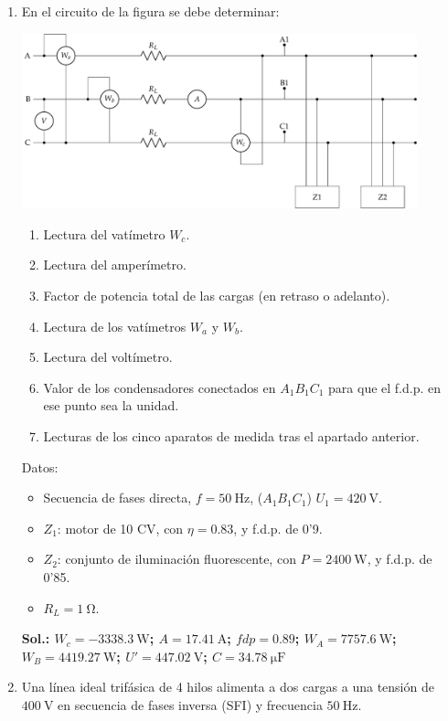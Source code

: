 \begin{enumerate}
\item En el circuito de la figura se debe determinar:

\begin{center}
  \includegraphics[width=0.9\textwidth]{../figs/BT3_11.pdf}
\end{center}

\begin{enumerate}
\item Lectura del vatímetro $W_c$.
\item Lectura del amperímetro.
\item Factor de potencia total de las cargas (en retraso o adelanto).
\item Lectura de los vatímetros $W_a$ y $W_b$.
\item Lectura del voltímetro.
\item Valor de los condensadores conectados en $A_1B_1C_1$ para que el
  f.d.p. en ese punto sea la unidad.
\item Lecturas de los cinco aparatos de medida tras el apartado
  anterior.
\end{enumerate}

Datos:
\begin{itemize}
\item Secuencia de fases directa, $f = \SI{50}{\hertz}$, ($A_1B_1C_1$)
  $U_1 = \SI{420}{\volt}$.
\item $Z_1$: motor de 10 CV, con $\eta = 0.83$, y f.d.p. de 0'9.
\item $Z_2$: conjunto de iluminación fluorescente, con
  $P = \SI{2400}{\watt}$, y f.d.p. de 0'85.
\item $R_L = \SI{1}{\ohm}$.
\end{itemize}

\textbf{Sol.: $ W_c = \qty{-3338.3}{\watt}$;
  $ A = \SI{17.41}{\ampere}$; $ fdp = 0.89$;
  $ W_A = \SI{7757.6}{\watt}$; $ W_B = \SI{4419.27}{\watt}$;
  $ U' = \SI{447.02}{\volt}$; $ C = \SI{34.78}{\micro\farad}$}

\item Una línea ideal trifásica de 4 hilos alimenta a dos cargas a una
  tensión de $\SI{400}{\volt}$ en secuencia de fases inversa (SFI) y
  frecuencia $\SI{50}{\hertz}$.


\end{enumerate}
